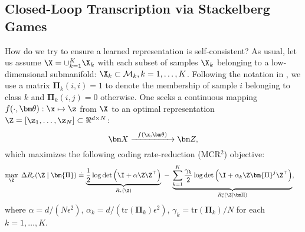 \documentclass[../../book-main.tex]{subfiles}
\begin{document}
\subsection{Closed-Loop Transcription via Stackelberg Games}\label{sec:closed-loop-transcription}



How do we try to ensure a learned representation is self-consistent? As usual, let us assume $\X = \cup_{k=1}^K \X_k$ with each subset of samples $\X_k$ belonging to a low-dimensional submanifold: $\X_k \subset \mathcal{M}_k, k = 1,\ldots, K$. Following the notation in , we use a matrix $\bm \Pi_k(i,i) = 1$ to denote the membership of sample $i$ belonging to class $k$ and $\bm \Pi_k(i,j) = 0$ otherwise. One seeks a continuous mapping $f(\cdot,\bm \theta): \x \mapsto \z$ from $\X$ to an optimal representation $\Z = [\z_1, \ldots, \z_N] \subset \Re^{d \times N}$:
\begin{equation}
\bm X  \xrightarrow{\hspace{2mm} f(\x, \bm \theta) \hspace{2mm}} \bm Z, 
\label{eqn:LDR}
\end{equation}
which maximizes the following coding rate-reduction (MCR$^2$) objective:
\begin{equation}\label{eq:mcr2-formulation}
\begin{split}
\max_{\Z} \; \Delta R_\epsilon(\Z  \mid \bm{\Pi}) %
&\doteq \underbrace{\frac{1}{2}\log\det \Big(\I + {\alpha} \Z \Z^\top \Big)}_{R_{\epsilon}(\Z)} \;-\; \underbrace{\sum_{k=1}^{K}\frac{\gamma_k}{2} \log\det\Big(\I + {\alpha_k} \Z \bm{\Pi}^{j} \Z^\top \Big)}_{R^c_{\epsilon}(\Z \mid \bm \Pi)},
\end{split}
\end{equation}
where $\alpha = {d}/({N\epsilon^2})$, $\alpha_k = d/({\mathrm{tr}(\bm{\Pi}_k)\epsilon^2})$, $\gamma_k =  {\mathrm{tr}(\bm{\Pi}_{k})}/{N}$ for each $k = 1,\dots, K$.
\end{document}
